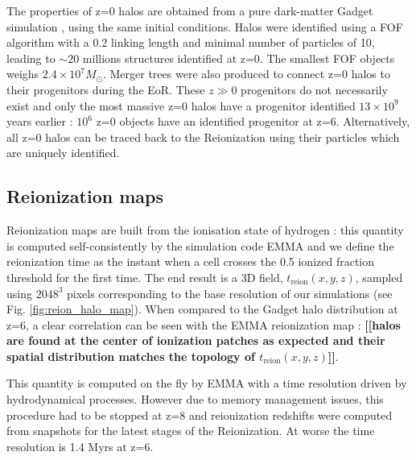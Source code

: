 \documentclass[twocolumn]{aastex61}
\newcommand{\dom}[1]{{\bf [[#1]]}}
\begin{document}

The properties of z=0 halos are obtained from a pure dark-matter Gadget simulation \citep{SPR5}, using the same initial conditions. %
Halos were identified using a FOF algorithm with a 0.2 linking length and minimal number of particles of 10, leading to $\sim 20$ millions structures identified at z=0. The smallest FOF objects weighs $2.4\times 10^7 M_\odot$. Merger trees were also produced to connect z=0 halos to their progenitors during the EoR. These $z\gg 0$ progenitors do not necessarily exist and only the most massive z=0 halos have a progenitor identified $13\times 10^9$ years earlier : $10^6$  z=0 objects have an identified progenitor at z=6. Alternatively, all z=0 halos can be traced back to the Reionization using their particles which are uniquely identified. 



\subsection{Reionization maps}
Reionization maps are built from the ionisation state of  hydrogen : this quantity is computed self-consistently by the simulation code EMMA and we define the reionization time as the  instant when a cell crosses  the 0.5 ionized fraction threshold for the first time.  The end result is a 3D field, $t_\mathrm{reion}(x,y,z)$, sampled using $2048^3$ pixels corresponding to the base resolution of our simulations (see Fig. \ref{fig:reion_halo_map}). When compared to the Gadget halo distribution at z=6,  a clear correlation can be seen with the EMMA reionization map : \dom{halos are found at the center of ionization patches as expected and their spatial distribution matches the topology of $t_\mathrm{reion}(x,y,z)$}.

This quantity is computed on the fly by EMMA with a time resolution driven by hydrodynamical processes. However due  to memory management issues, this procedure had to be stopped at z=8 and reionization redshifts were computed from snapshots for the latest stages of the Reionization. At worse the time resolution is 1.4 Myrs at z=6.
\end{document}
